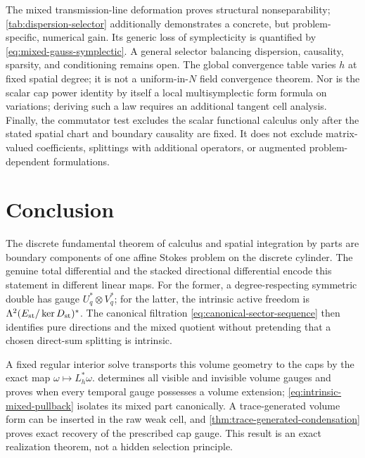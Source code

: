 \documentclass[11pt,a4paper]{article}
\begin{document}
The mixed transmission-line deformation proves structural
nonseparability; \cref{tab:dispersion-selector} additionally demonstrates
a concrete, but problem-specific, numerical gain.  Its generic loss of
symplecticity is quantified by \cref{eq:mixed-gauss-symplectic}.  A general
selector balancing dispersion, causality, sparsity, and conditioning
remains open.  The global convergence table varies \(h\) at fixed spatial
degree; it is not a uniform-in-\(N\) field convergence theorem.  Nor is
the scalar cap power identity by itself a local multisymplectic form
formula on variations; deriving such a law requires an additional tangent
cell analysis.  Finally,
the commutator test excludes the scalar functional calculus only after the
stated spatial chart and boundary causality are fixed.  It does not exclude
matrix-valued coefficients, splittings with additional operators, or
augmented problem-dependent formulations.

\section{Conclusion}

The discrete fundamental theorem of calculus and spatial integration by
parts are boundary components of one affine Stokes problem on the
discrete cylinder.  The genuine total differential and the stacked
directional differential encode this statement in different linear maps.
For the former, a degree-respecting symmetric double has gauge
\(U_q^*\otimes V_q^*\); for the latter, the intrinsic active freedom is
\(\Lambda^2(E_{\rm st}/\ker D_{\rm st})^*\).  The canonical filtration
\cref{eq:canonical-sector-sequence} then identifies pure directions and
the mixed quotient without pretending that a chosen direct-sum splitting
is intrinsic.

A fixed regular interior solve transports this volume geometry to the
caps by the exact map \(\omega\mapsto L_h^*\omega\).
 determines all visible and invisible
volume gauges and proves when every temporal gauge possesses a volume
extension; \cref{eq:intrinsic-mixed-pullback} isolates its mixed part
canonically.  A trace-generated volume form can be inserted in the raw
weak cell, and \cref{thm:trace-generated-condensation} proves exact
recovery of the prescribed cap gauge.  This result is an exact
realization theorem, not a hidden selection principle.
\end{document}
